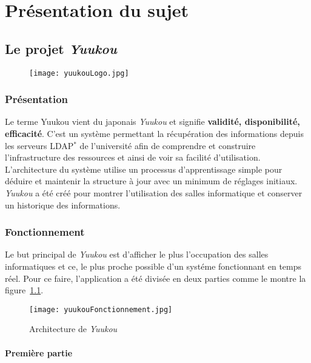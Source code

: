 \chapter{Pr\'esentation du sujet}

\section{Le projet \textit{Yuukou}}

\begin{figure}[!ht]
	\centering
	\texttt{[image: yuukouLogo.jpg]}

\end{figure}

\subsection{Pr\'esentation}

Le terme Yuukou vient du japonais \textit{Yuukou} et signifie \textbf{validit\'e, disponibilit\'e, efficacit\'e}. 
C'est un syst\`eme permettant la r\'ecup\'eration des informations depuis les serveurs LDAP$^*$ de l'universit\'e afin de comprendre et construire l'infrastructure des ressources et ainsi de voir sa facilit\'e d'utilisation. 
L'architecture du syst\`eme utilise un processus d'apprentissage simple pour d\'eduire et maintenir la structure \`a jour avec un minimum de r\'eglages initiaux.
\textit{Yuukou} a \'et\'e cr\'e\'e pour montrer l'utilisation des salles informatique et conserver un historique des informations.

\subsection{Fonctionnement}

Le but principal de \textit{Yuukou} est d'afficher le plus l'occupation des salles informatiques et ce, le plus proche possible d'un syst\'eme fonctionnant en temps r\'eel.
Pour ce faire, l'application a \'et\'e divis\'ee en deux parties  comme le montre la figure~\ref{yuukouFonctionnement}.

\clearpage

\begin{figure}[!ht]
	\centering
	\texttt{[image: yuukouFonctionnement.jpg]}
	\caption{Architecture de \textit{Yuukou}}
	\label{yuukouFonctionnement}

\end{figure}

\subsubsection{Premi\`ere partie}

